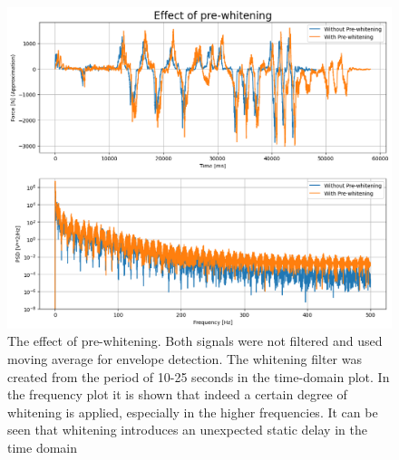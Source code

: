 \begin{figure}[h!t]
	\begin{center}
		\includegraphics[width=1.0\columnwidth]{images/measurement_prewhitening.png}
	\end{center}
	\caption{The effect of pre-whitening. Both signals were not filtered and used moving average for envelope detection. The whitening filter was created from the period of 10-25 seconds in the time-domain plot. In the frequency plot it is shown that indeed a certain degree of whitening is applied, especially in the higher frequencies. It can be seen that whitening introduces an unexpected static delay in the time domain}
	\label{fig:result_prewhitening}
\end{figure}

